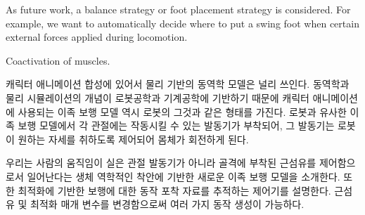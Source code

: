 \documentclass[master,english,final]{kaist-ucs}
\begin{document}

As future work, a balance strategy or foot placement strategy is
considered. For example, we want to automatically decide
where to put a swing foot when certain external forces applied during locomotion.

Coactivation of muscles.

\begin{summary}

캐릭터 애니메이션 합성에 있어서 물리 기반의 동역학 모델은 널리 쓰인다.
동역학과 물리 시뮬레이션의 개념이 로봇공학과 기계공학에 기반하기 때문에
캐릭터 애니메이션에 사용되는 이족 보행 모델 역시 로봇의 그것과 같은
형태를 가진다. 로봇과 유사한 이족 보행 모델에서 각 관절에는 작동시킬 수 있는 발동기가
부착되어, 그 발동기는 로봇이 원하는 자세를 취하도록 제어되어 몸체가 회전하게 된다.

우리는 사람의 움직임이 실은 관절 발동기가 아니라 골격에 부착된 근섬유를
제어함으로서 일어난다는 생체 역학적인 착안에 기반한 새로운 이족 보행 모델을 소개한다.
또한 최적화에 기반한 보행에 대한 동작 포착 자료를 추적하는 제어기를 설명한다.
근섬유 및 최적화 매개 변수를 변경함으로써 여러 가지 동작 생성이 가능하다.

\end{summary}





\acknowledgement


\end{document}
